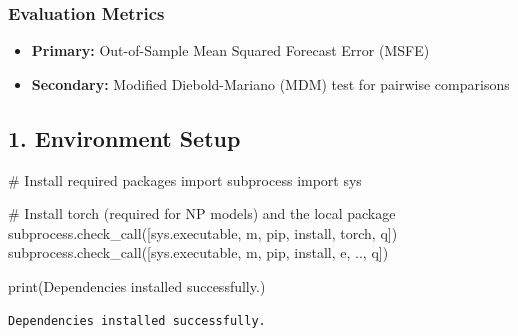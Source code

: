 \documentclass[
  letterpaper,
  DIV=11,
  numbers=noendperiod]{scrartcl}
\newenvironment{Shaded}{\begin{snugshade}}{\end{snugshade}}
\newcommand{\BuiltInTok}[1]{\textcolor[rgb]{0.00,0.23,0.31}{#1}}
\newcommand{\CommentTok}[1]{\textcolor[rgb]{0.37,0.37,0.37}{#1}}
\newcommand{\ImportTok}[1]{\textcolor[rgb]{0.00,0.46,0.62}{#1}}
\newcommand{\NormalTok}[1]{\textcolor[rgb]{0.00,0.23,0.31}{#1}}
\newcommand{\StringTok}[1]{\textcolor[rgb]{0.13,0.47,0.30}{#1}}
\providecommand{\tightlist}{%
  \setlength{\itemsep}{0pt}\setlength{\parskip}{0pt}}
\begin{document}
\subsubsection{Evaluation Metrics}\label{evaluation-metrics}

\begin{itemize}
\tightlist
\item
  \textbf{Primary:} Out-of-Sample Mean Squared Forecast Error (MSFE)
\item
  \textbf{Secondary:} Modified Diebold-Mariano (MDM) test for pairwise
  comparisons
\end{itemize}

\subsection{1. Environment Setup}\label{environment-setup}

\begin{Shaded}
\begin{Highlighting}[]
\CommentTok{\# Install required packages}
\ImportTok{import}\NormalTok{ subprocess}
\ImportTok{import}\NormalTok{ sys}

\CommentTok{\# Install torch (required for NP models) and the local package}
\NormalTok{subprocess.check\_call([sys.executable, }\StringTok{\textquotesingle{}{-}m\textquotesingle{}}\NormalTok{, }\StringTok{\textquotesingle{}pip\textquotesingle{}}\NormalTok{, }\StringTok{\textquotesingle{}install\textquotesingle{}}\NormalTok{, }\StringTok{\textquotesingle{}torch\textquotesingle{}}\NormalTok{, }\StringTok{\textquotesingle{}{-}q\textquotesingle{}}\NormalTok{])}
\NormalTok{subprocess.check\_call([sys.executable, }\StringTok{\textquotesingle{}{-}m\textquotesingle{}}\NormalTok{, }\StringTok{\textquotesingle{}pip\textquotesingle{}}\NormalTok{, }\StringTok{\textquotesingle{}install\textquotesingle{}}\NormalTok{, }\StringTok{\textquotesingle{}{-}e\textquotesingle{}}\NormalTok{, }\StringTok{\textquotesingle{}..\textquotesingle{}}\NormalTok{, }\StringTok{\textquotesingle{}{-}q\textquotesingle{}}\NormalTok{])}

\BuiltInTok{print}\NormalTok{(}\StringTok{\textquotesingle{}Dependencies installed successfully.\textquotesingle{}}\NormalTok{)}
\end{Highlighting}
\end{Shaded}

\begin{verbatim}
Dependencies installed successfully.
\end{verbatim}
\end{document}
